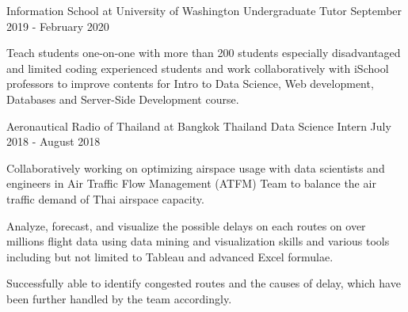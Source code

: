 \begin{cventries}
{\begin{cvitems}
      \end{cvitems}
    }
  \cventry
    {Information School at University of Washington} %
    {Undergraduate Tutor} %
    {September 2019 - February 2020} %
    {} %
    {
      \begin{cvitems} %
        \item {
          Teach students one-on-one with more than 200 students especially disadvantaged and limited coding experienced students and work collaboratively with iSchool professors to improve contents for Intro to Data Science, Web development, Databases and Server-Side Development course.
        }
      \end{cvitems}
    }
  \cventry
     {Aeronautical Radio of Thailand at Bangkok Thailand} %
     {Data Science Intern} %
     {July 2018 - August 2018} %
     {} %
     {
      \begin{cvitems} %
         \item {
            Collaboratively working on optimizing airspace usage with data scientists and engineers in Air Traffic Flow Management (ATFM) Team to balance the air traffic demand of Thai airspace capacity.
         }
         \item {
            Analyze, forecast, and visualize the possible delays on each routes on over millions flight data using data mining and visualization skills and various tools including but not limited to Tableau and advanced Excel formulae.
         }
         \item {
            Successfully able to identify congested routes and the causes of delay, which have been further handled by the team accordingly.
         }
      \end{cvitems}
     }


\end{cventries}
